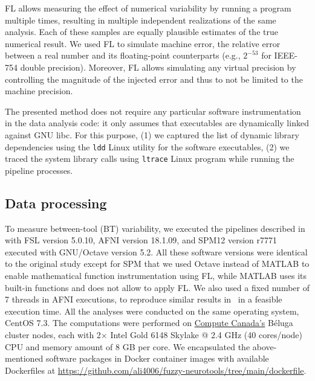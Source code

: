 \documentclass[conference]{IEEEtran}
\begin{document}

%

FL allows measuring the effect of numerical variability by running a program multiple times, 
resulting in multiple independent realizations of the same analysis. Each of these samples 
are equally plausible estimates of the true numerical result. 
We used FL to simulate machine error, the relative error between a real number and its floating-point counterparts
(e.g., $2^{-53}$ for IEEE-754 double precision).
Moreover, FL allows simulating any virtual precision
by controlling the magnitude of the injected error and
thus to not be limited to the machine precision.

The presented method does not require any
particular software instrumentation in the data analysis code: it only
assumes that executables are dynamically linked against GNU libc. For this purpose,
(1) we captured the list of dynamic library dependencies using the \texttt{ldd} Linux utility for the software executables,
(2) we traced the system library calls using \texttt{ltrace} Linux program while running the pipeline processes.


\subsection{Data processing}

To measure between-tool (BT) variability, we executed the pipelines described in~\cite{bowring2019exploring}
with FSL version 5.0.10, AFNI version 18.1.09, and SPM12 version r7771
executed with GNU/Octave version 5.2.
All these software versions were identical to the original study except for SPM
that we used Octave instead of MATLAB to enable mathematical function instrumentation using FL,
while MATLAB uses its built-in functions and does not allow to apply FL.
We also used a fixed number of 7 threads in AFNI executions,
to reproduce similar results in~\cite{bowring2019exploring} in a feasible execution time.
All the analyses were conducted on the same operating system, CentOS 7.3.
The computations were performed on \href{https://www.computecanada.ca}{Compute Canada's} Béluga cluster nodes,
each with 2× Intel Gold 6148 Skylake @ 2.4 GHz (40 cores/node) CPU and memory amount of 8 GB per core.
We encapsulated the above-mentioned software packages in Docker container images with available Dockerfiles at \url{https://github.com/ali4006/fuzzy-neurotools/tree/main/dockerfile}.
\end{document}

